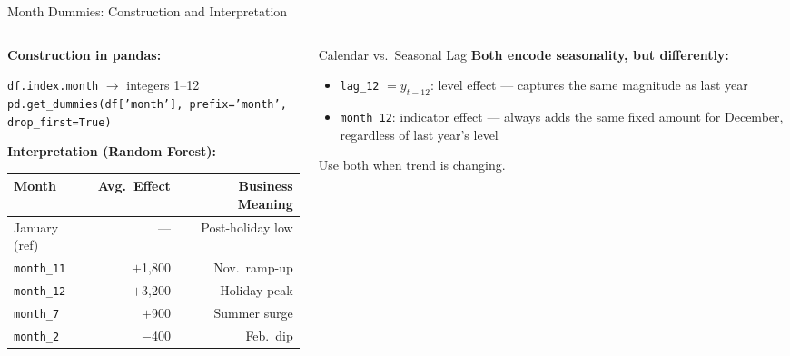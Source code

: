 \documentclass[aspectratio=169, 10pt]{beamer}
\begin{document}
\begin{frame}{Month Dummies: Construction and Interpretation}
  \begin{columns}[T]
    \begin{column}{0.52\textwidth}
      \textbf{Construction in pandas:}

      \smallskip
      \footnotesize
      \texttt{df.index.month} $\rightarrow$ integers 1--12 \\[4pt]
      \texttt{pd.get\_dummies(df['month'], prefix='month',
      drop\_first=True)}

      \bigskip
      \textbf{Interpretation (Random Forest):}
      \begin{center}
      \footnotesize
      \begin{tabular}{lrr}
        \toprule
        \textbf{Month} & \textbf{Avg.\ Effect}
                       & \textbf{Business Meaning} \\
        \midrule
        January (ref) & ---    & Post-holiday low \\
        \texttt{month\_11}     & $+$1,800 & Nov.\ ramp-up \\
        \texttt{month\_12}     & $+$3,200 & Holiday peak \\
        \texttt{month\_7}      & $+$900   & Summer surge \\
        \texttt{month\_2}      & $-$400   & Feb.\ dip \\
        \bottomrule
      \end{tabular}
      \end{center}
    \end{column}
    \begin{column}{0.44\textwidth}
      \begin{examplebox}{Calendar vs.\ Seasonal Lag}
        \footnotesize
        \textbf{Both encode seasonality, but differently:}
        \begin{itemize}
          \item \texttt{lag\_12} $= y_{t-12}$: level effect ---
                captures the same magnitude as last year
          \item \texttt{month\_12}: indicator effect ---
                always adds the same fixed amount for
                December, regardless of last year's level
        \end{itemize}
        Use both when trend is changing.
      \end{examplebox}

      \smallskip
    \end{column}
  \end{columns}
\end{frame}
\end{document}
